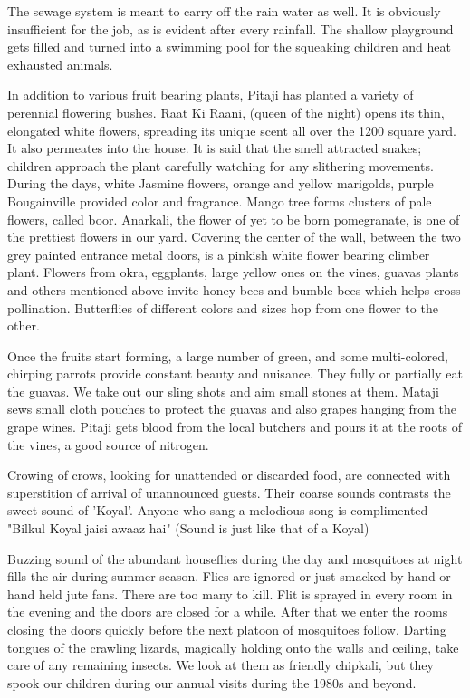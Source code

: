 The sewage system is meant to carry off the rain water as well. It is
obviously insufficient for the job, as is evident after every rainfall.
The shallow playground gets filled and turned into a swimming pool for the
squeaking children and heat exhausted animals.

In addition to various fruit bearing plants, Pitaji has planted a variety
of perennial flowering bushes. Raat Ki Raani, (queen of the night) opens
its thin, elongated white flowers, spreading its unique scent all over the
1200 square yard. It also permeates into the house. It is said that the
smell attracted snakes; children approach the plant carefully watching for
any slithering movements. During the days, white Jasmine flowers, orange
and yellow marigolds, purple Bougainville provided color and fragrance.
Mango tree forms clusters of pale flowers, called boor. Anarkali, the
flower of yet to be born pomegranate, is one of the prettiest flowers in
our yard. Covering the center of the wall, between the two grey painted
entrance metal doors, is a pinkish white flower bearing climber plant.
Flowers from okra, eggplants, large yellow ones on the vines, guavas
plants and others mentioned above invite honey bees and bumble bees which
helps cross pollination. Butterflies of different colors and sizes hop
from one flower to the other. 

Once the fruits start forming, a large number of green, and some
multi-colored, chirping parrots provide constant beauty and nuisance. They
fully or partially eat the guavas. We take out our sling shots and aim
small stones at them. Mataji sews small cloth pouches to protect the
guavas and also grapes hanging from the grape wines. Pitaji gets blood
from the local butchers and pours it at the roots of the vines, a good
source of nitrogen. 

Crowing of crows, looking for unattended or discarded food, are connected
with superstition of arrival of unannounced guests. Their coarse sounds
contrasts the sweet sound of 'Koyal'. Anyone who sang a melodious song is
complimented "Bilkul Koyal jaisi awaaz hai" (Sound is just like that of
a Koyal)

Buzzing sound of the abundant houseflies during the day and mosquitoes at
night fills the air during summer season. Flies are ignored or just
smacked by hand or hand held jute fans. There are too many to kill. Flit
is sprayed in every room in the evening and the doors are closed for
a while. After that we enter the rooms closing the doors quickly before
the next platoon of mosquitoes follow. Darting tongues of the crawling
lizards, magically holding onto the walls and ceiling, take care of any
remaining insects. We look at them as friendly chipkali, but they spook
our children during our annual visits during the 1980s and beyond. 

